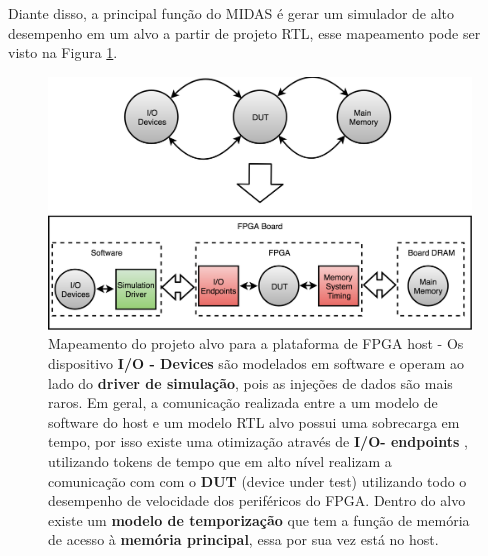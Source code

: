 \documentclass[conference]{IEEEtran}
\begin{document}
	
	Diante disso, a principal função do MIDAS é gerar um simulador de alto desempenho em um alvo a partir de projeto RTL, esse mapeamento pode ser visto na Figura \ref{Mapeamento}.	
	
	\begin{figure}[htbp]
		\centerline{\includegraphics[scale=0.14]{fig2.png}}
		\caption{Mapeamento do projeto alvo para a plataforma de FPGA host -
			Os dispositivo  \textbf{I/O - Devices} são modelados em software e operam ao lado do \textbf{driver de simulação}, pois  as injeções de dados são mais raros.
			Em geral, a comunicação realizada entre a um modelo de software do host e um modelo RTL alvo possui uma sobrecarga em tempo, por isso existe uma otimização através de  \textbf{I/O- endpoints} , utilizando tokens de tempo que em alto nível  realizam a comunicação com  com o \textbf{DUT} (device under test) utilizando todo o  desempenho de velocidade dos periféricos do FPGA.	
			Dentro do alvo existe um \textbf{modelo de temporização} que tem a função de memória de acesso à \textbf{memória principal}, essa por sua vez está no host.
		}
		
		\label{Mapeamento}
	\end{figure}
	
	
	
	
	
\end{document}
